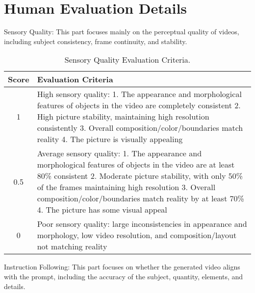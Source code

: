 \clearpage
\section{Human Evaluation Details}\label{sec:human_evalution}

Sensory Quality: This part focuses mainly on the perceptual quality of videos, including subject consistency, frame continuity, and stability.

\begin{table}[h]
\centering
\caption{Sensory Quality Evaluation Criteria.}
\label{sample-table}
\small

\begin{tabular}{cp{11cm}}
\toprule

\textbf{Score} & \textbf{Evaluation Criteria} \\
\midrule
1  & High sensory quality: 1. The appearance and morphological features of objects in the video are completely consistent 2. High picture stability, maintaining high resolution consistently 3. Overall composition/color/boundaries match reality 4. The picture is visually appealing \\
\midrule
0.5  & Average sensory quality: 1. The appearance and morphological features of objects in the video are at least 80\% consistent 2. Moderate picture stability, with only 50\% of the frames maintaining high resolution 3. Overall composition/color/boundaries match reality by at least 70\% 4. The picture has some visual appeal \\
\midrule
0  & Poor sensory quality: large inconsistencies in appearance and morphology, low video resolution, and composition/layout not matching reality \\

\bottomrule
\end{tabular}
\end{table}

Instruction Following: This part focuses on whether the generated video aligns with the prompt, including the accuracy of the subject, quantity, elements, and details.

